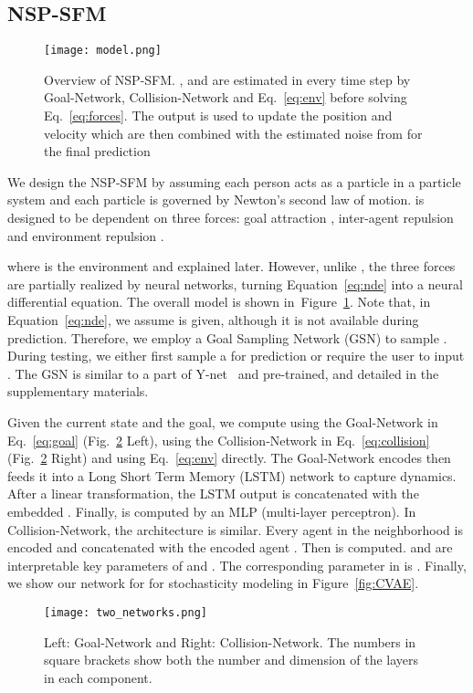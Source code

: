 \documentclass[runningheads]{llncs}
\newcommand{\Figref}[1]{Figure~\ref{fig:#1}}
\newcommand{\figref}[1]{Fig.~\ref{fig:#1}}
\newcommand{\Eqnref}[1]{Equation~\ref{eq:#1}}
\newcommand{\eqnref}[1]{Eq.~\ref{eq:#1}}
\begin{document}
\subsection{NSP-SFM}
\begin{figure}[b]
\centering
\texttt{[image: model.png]}
\caption{Overview of NSP-SFM. ,  and  are estimated in every time step by Goal-Network, Collision-Network and \eqnref{env} before solving \eqnref{forces}. The output is used to update the position and velocity which are then combined with the estimated noise from  for the final prediction}
\label{fig:model}
\end{figure}

We design the NSP-SFM by assuming each person acts as a particle in a particle system and each particle is governed by Newton's second law of motion.  is designed to be dependent on three forces: goal attraction , inter-agent repulsion  and environment repulsion .

where  is the environment and explained later. However, unlike \cite{helbing1995social}, the three forces are partially realized by neural networks, turning \Eqnref{nde} into a neural differential equation.
The overall model is shown in~\Figref{model}. Note that, in \Eqnref{nde}, we assume  is given, although it is not available during prediction. Therefore, we employ a Goal Sampling Network (GSN) to sample . During testing, we either first sample a  for prediction or require the user to input . The GSN is similar to a part of Y-net~\cite{mangalam2021goals} and pre-trained, and detailed in the supplementary materials.

Given the current state and the goal, we compute  using the Goal-Network  in \eqnref{goal} (\figref{subnets} Left),  using the Collision-Network  in \eqnref{collision} (\figref{subnets} Right) and  using \eqnref{env} directly. The Goal-Network encodes  then feeds it into a Long Short Term Memory (LSTM) network to capture dynamics. After a linear transformation, the LSTM output is concatenated with the embedded . Finally,  is computed by an MLP (multi-layer perceptron). In Collision-Network, the architecture is similar. Every agent  in the neighborhood  is encoded and concatenated with the encoded agent . Then  is computed.  and  are interpretable key parameters of  and . The corresponding parameter in  is . Finally, we show our network for  for stochasticity modeling in \Figref{CVAE}.

\begin{figure}[tb]
\centering
\texttt{[image: two\_networks.png]}
\caption{Left: Goal-Network and Right: Collision-Network. The numbers in square brackets show both the number and dimension of the layers in each component.}
\label{fig:subnets}
\end{figure}
\end{document}
